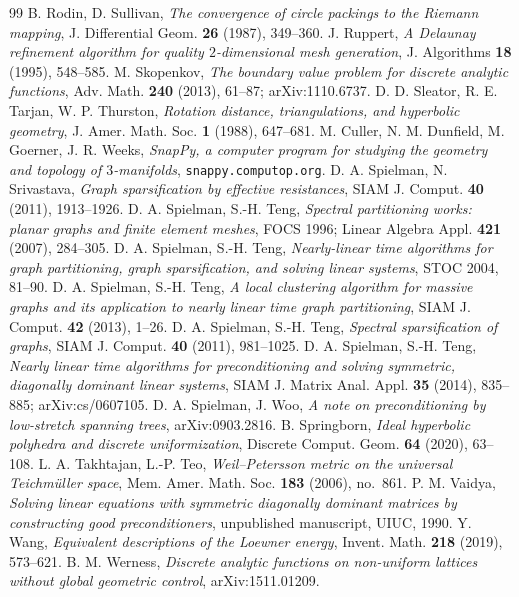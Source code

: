 \documentclass[11pt]{amsart}
\theoremstyle{definition}
\theoremstyle{remark}
\begin{document}
\begin{thebibliography}{99}
 B. Rodin, D. Sullivan, \emph{The convergence of circle packings to the Riemann mapping}, J. Differential Geom. \textbf{26} (1987), 349--360.
 J. Ruppert, \emph{A Delaunay refinement algorithm for quality $2$-dimensional mesh generation}, J. Algorithms \textbf{18} (1995), 548--585.
 M. Skopenkov, \emph{The boundary value problem for discrete analytic functions}, Adv. Math. \textbf{240} (2013), 61--87; arXiv:1110.6737.
 D. D. Sleator, R. E. Tarjan, W. P. Thurston, \emph{Rotation distance, triangulations, and hyperbolic geometry}, J. Amer. Math. Soc. \textbf{1} (1988), 647--681.
 M. Culler, N. M. Dunfield, M. Goerner, J. R. Weeks, \emph{SnapPy, a computer program for studying the geometry and topology of $3$-manifolds}, \texttt{snappy.computop.org}.
 D. A. Spielman, N. Srivastava, \emph{Graph sparsification by effective resistances}, SIAM J. Comput. \textbf{40} (2011), 1913--1926.
 D. A. Spielman, S.-H. Teng, \emph{Spectral partitioning works: planar graphs and finite element meshes}, FOCS 1996; Linear Algebra Appl. \textbf{421} (2007), 284--305.
 D. A. Spielman, S.-H. Teng, \emph{Nearly-linear time algorithms for graph partitioning, graph sparsification, and solving linear systems}, STOC 2004, 81--90.
 D. A. Spielman, S.-H. Teng, \emph{A local clustering algorithm for massive graphs and its application to nearly linear time graph partitioning}, SIAM J. Comput. \textbf{42} (2013), 1--26.
 D. A. Spielman, S.-H. Teng, \emph{Spectral sparsification of graphs}, SIAM J. Comput. \textbf{40} (2011), 981--1025.
 D. A. Spielman, S.-H. Teng, \emph{Nearly linear time algorithms for preconditioning and solving symmetric, diagonally dominant linear systems}, SIAM J. Matrix Anal. Appl. \textbf{35} (2014), 835--885; arXiv:cs/0607105.
 D. A. Spielman, J. Woo, \emph{A note on preconditioning by low-stretch spanning trees}, arXiv:0903.2816.
 B. Springborn, \emph{Ideal hyperbolic polyhedra and discrete uniformization}, Discrete Comput. Geom. \textbf{64} (2020), 63--108.
 L. A. Takhtajan, L.-P. Teo, \emph{Weil--Petersson metric on the universal Teichm\"uller space}, Mem. Amer. Math. Soc. \textbf{183} (2006), no.~861.
 P. M. Vaidya, \emph{Solving linear equations with symmetric diagonally dominant matrices by constructing good preconditioners}, unpublished manuscript, UIUC, 1990.
 Y. Wang, \emph{Equivalent descriptions of the Loewner energy}, Invent. Math. \textbf{218} (2019), 573--621.
 B. M. Werness, \emph{Discrete analytic functions on non-uniform lattices without global geometric control}, arXiv:1511.01209.

\end{thebibliography}
\end{document}
